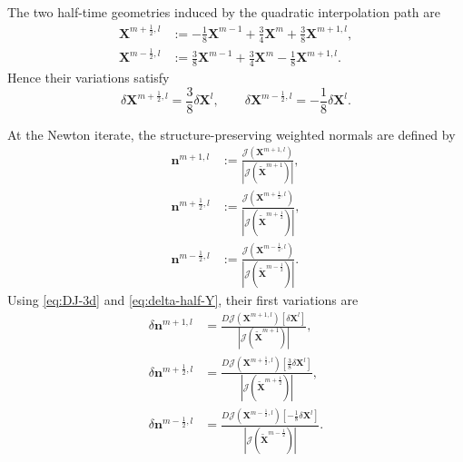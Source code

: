 \documentclass[smallextended]{svjour3}
\numberwithin{equation}{section}
\begin{document}
	The two half-time geometries induced by the quadratic interpolation path are
	\begin{align}
		\mathbf{X}^{m+\frac12,l}
		&:=
		-\frac18\mathbf{X}^{m-1}
		+\frac34\mathbf{X}^{m}
		+\frac38\mathbf{X}^{m+1,l},
		\\
		\mathbf{X}^{m-\frac12,l}
		&:=
		\frac38\mathbf{X}^{m-1}
		+\frac34\mathbf{X}^{m}
		-\frac18\mathbf{X}^{m+1,l}.
	\end{align}
	Hence their variations satisfy
	\begin{equation}
		\delta\mathbf{X}^{m+\frac12,l}
		=
		\frac38\delta\mathbf{X}^{l},
		\qquad
		\delta\mathbf{X}^{m-\frac12,l}
		=
		-\frac18\delta\mathbf{X}^{l}.
		\label{eq:delta-half-Y}
	\end{equation}
	
	At the Newton iterate, the structure-preserving weighted normals are defined by
	\begin{align}
		\mathbf{n}^{m+1,l}
		&:=
		\frac{\mathcal{J}(\mathbf{X}^{m+1,l})}
		{|\mathcal{J}(\widetilde{\mathbf{X}}^{m+1})|},
		\\
		\mathbf{n}^{m+\frac12,l}
		&:=
		\frac{\mathcal{J}(\mathbf{X}^{m+\frac12,l})}
		{|\mathcal{J}(\widetilde{\mathbf{X}}^{m+\frac12})|},
		\\
		\mathbf{n}^{m-\frac12,l}
		&:=
		\frac{\mathcal{J}(\mathbf{X}^{m-\frac12,l})}
		{|\mathcal{J}(\widetilde{\mathbf{X}}^{m-\frac12})|}.
	\end{align}
	Using \eqref{eq:DJ-3d} and \eqref{eq:delta-half-Y}, their first variations are
	\begin{align}
		\delta\mathbf{n}^{m+1,l}
		&=
		\frac{
			D\mathcal{J}(\mathbf{X}^{m+1,l})[\delta\mathbf{X}^{l}]
		}{
			|\mathcal{J}(\widetilde{\mathbf{X}}^{m+1})|
		},
		\label{eq:dn-mplus-3d}
		\\
		\delta\mathbf{n}^{m+\frac12,l}
		&=
		\frac{
			D\mathcal{J}(\mathbf{X}^{m+\frac12,l})[\frac38\delta\mathbf{X}^{l}]
		}{
			|\mathcal{J}(\widetilde{\mathbf{X}}^{m+\frac12})|
		},
		\label{eq:dn-phalf-3d}
		\\
		\delta\mathbf{n}^{m-\frac12,l}
		&=
		\frac{
			D\mathcal{J}(\mathbf{X}^{m-\frac12,l})[-\frac18\delta\mathbf{X}^{l}]
		}{
			|\mathcal{J}(\widetilde{\mathbf{X}}^{m-\frac12})|
		}.
		\label{eq:dn-mhalf-3d}
	\end{align}
	
\end{document}
